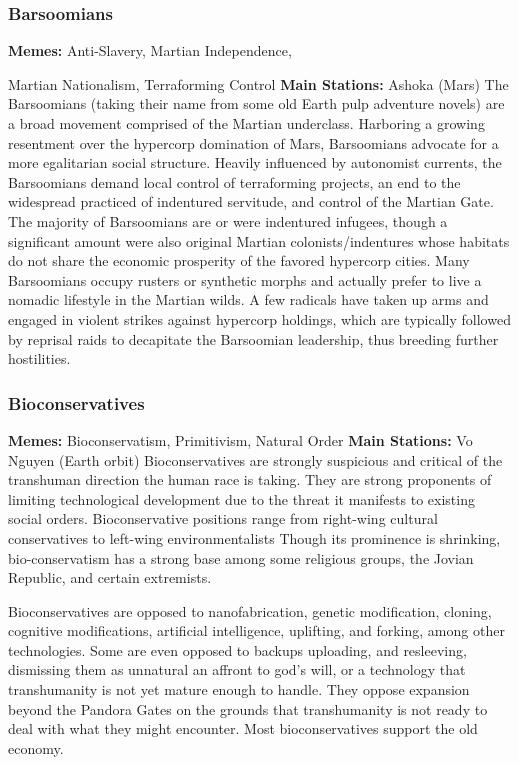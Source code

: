 \subsubsection{Barsoomians}

\textbf{Memes:} Anti-Slavery, Martian Independence, 

Martian Nationalism, Terraforming Control
\textbf{Main Stations:} Ashoka (Mars)
The Barsoomians (taking their name from some old 
Earth pulp adventure novels) are a broad movement 
comprised of the Martian underclass. Harboring a 
growing resentment over the hypercorp domination 
of Mars, Barsoomians advocate for a more egalitarian
social structure. Heavily influenced by autonomist
currents, the Barsoomians demand local control 
of terraforming projects, an end to the widespread 
practiced of indentured servitude, and control of the 
Martian Gate. The majority of Barsoomians are or 
were indentured infugees, though a significant amount 
were also original Martian colonists/indentures whose 
habitats do not share the economic prosperity of the 
favored hypercorp cities. Many Barsoomians occupy 
rusters or synthetic morphs and actually prefer to 
live a nomadic lifestyle in the Martian wilds. A few 
radicals have taken up arms and engaged in violent 
strikes against hypercorp holdings, which are typically 
followed by reprisal raids to decapitate the Barsoomian
leadership, thus breeding further hostilities.

\subsubsection{Bioconservatives}

\textbf{Memes:} Bioconservatism, Primitivism, Natural Order
\textbf{Main Stations:} Vo Nguyen (Earth orbit)
Bioconservatives are strongly suspicious and critical 
of the transhuman direction the human race is taking. 
They are strong proponents of limiting technological 
development due to the threat it manifests to existing 
social orders. Bioconservative positions range from 
right-wing cultural conservatives to left-wing environmentalists
Though its prominence is shrinking, bio-conservatism
has a strong base among some religious
groups, the Jovian Republic, and certain extremists.

Bioconservatives are opposed to nanofabrication, 
genetic modification, cloning, cognitive modifications, 
artificial intelligence, uplifting, and forking, among 
other technologies. Some are even opposed to backups
uploading, and resleeving, dismissing them as unnatural
an affront to god's will, or a technology that
transhumanity is not yet mature enough to handle. 
They oppose expansion beyond the Pandora Gates on 
the grounds that transhumanity is not ready to deal 
with what they might encounter. Most bioconservatives
support the old economy.

